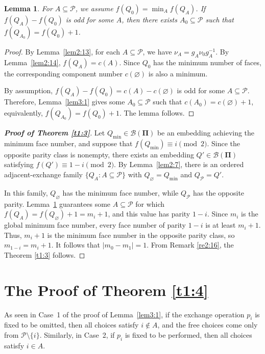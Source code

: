 \documentclass[10pt,a4paper]{amsart}
\newtheorem{lemma}[theorem]{Lemma}
\begin{document}
\begin{lemma}
\label{lem3:2}
For $A\subseteq \mathcal P$, we assume $f(Q_0)=\min_A f(Q_A)$. If $f(Q_A)-f(Q_0)$ is odd for some $A$, then there exists $A_0\subseteq\mathcal P$ such that $f(Q_{A_0})=f(Q_0)+1$.
\end{lemma}


\begin{proof}
By Lemma~\ref{lem2:13}, for each $A\subseteq\mathcal P$, we have
$\nu_A=g_A\nu_0g_A^{-1}$. By Lemma~\ref{lem2:14},
$f(Q_A)=c(A)$. Since $Q_0$ has the minimum number of faces, the
corresponding component number $c(\varnothing)$ is also a minimum.

By assumption, $f(Q_A)-f(Q_0)=c(A)-c(\varnothing)$ is odd for some
$A\subseteq\mathcal P$. Therefore, Lemma~\ref{lem3:1} gives some
$A_0\subseteq\mathcal P$ such that
$c(A_0)=c(\varnothing)+1$, equivalently,
$f(Q_{A_0})=f(Q_0)+1$. The lemma follows.
\end{proof}

\begin{proof}[\bf{Proof of Theorem \ref{t1:3}}]
 Let $Q_{\min}\in\mathcal B(\mathbf{\Pi})$ be an embedding achieving the minimum face number, and suppose that $f(Q_{\min})\equiv i\pmod{2}$. Since the opposite parity class is nonempty, there exists an embedding $Q'\in\mathcal B(\mathbf{\Pi})$ satisfying $f(Q')\equiv 1-i\pmod{2}$. By Lemma~\ref{lem2:7}, there is an ordered adjacent-exchange family $\{Q_A:A\subseteq\mathcal P\}$ with $Q_\varnothing=Q_{\min}$ and $Q_{\mathcal P}=Q'$.

In this family, $Q_\varnothing$ has the minimum face number, while $Q_{\mathcal P}$ has the opposite parity. Lemma~\ref{lem3:2} guarantees some $A\subseteq\mathcal P$ for which $f(Q_A)=f(Q_\varnothing)+1=m_i+1$, and this value has parity $1-i$. Since $m_i$ is the global minimum face number, every face number of parity $1-i$ is at least $m_i+1$. Thus, $m_i+1$ is the minimum face number in the opposite parity class, so $m_{1-i}=m_i+1$. It follows that $|m_0-m_1|=1$. From Remark \ref{re2:16}, the Theorem \ref{t1:3} follows.
\end{proof}

\section{The Proof of Theorem \ref{t1:4}}\label{Sec:4}

 As seen in Case~1 of the proof of Lemma~\ref{lem3:1}, if the exchange operation $p_i$ is fixed to be omitted, then all choices satisfy $i\notin A$, and the free choices come only from $\mathcal P\setminus\{i\}$. Similarly, in Case~2, if $p_i$ is fixed to be performed, then all choices satisfy $i\in A$.
\end{document}
